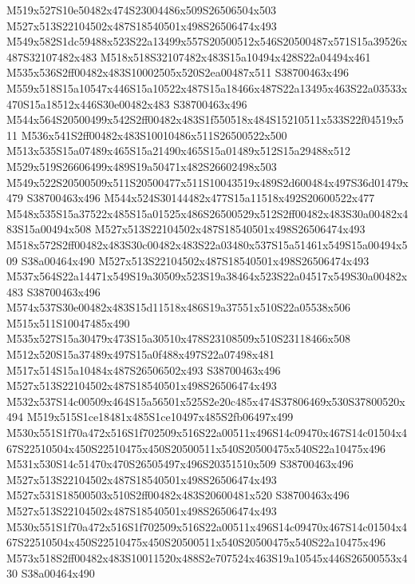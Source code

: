 \documentclass{article}
\begin{document}
\begin{multicols}{2}
M519x527S10e50482x474S23004486x509S26506504x503 M527x513S22104502x487S18540501x498S26506474x493 M549x582S1dc59488x523S22a13499x557S20500512x546S20500487x571S15a39526x487S32107482x483 M518x518S32107482x483S15a10494x428S22a04494x461 M535x536S2ff00482x483S10002505x520S2ea00487x511 S38700463x496 M559x518S15a10547x446S15a10522x487S15a18466x487S22a13495x463S22a03533x470S15a18512x446S30e00482x483 S38700463x496 M544x564S20500499x542S2ff00482x483S1f550518x484S15210511x533S22f04519x511 M536x541S2ff00482x483S10010486x511S26500522x500 M513x535S15a07489x465S15a21490x465S15a01489x512S15a29488x512 M529x519S26606499x489S19a50471x482S26602498x503 M549x522S20500509x511S20500477x511S10043519x489S2d600484x497S36d01479x479 S38700463x496 M544x524S30144482x477S15a11518x492S20600522x477 M548x535S15a37522x485S15a01525x486S26500529x512S2ff00482x483S30a00482x483S15a00494x508 M527x513S22104502x487S18540501x498S26506474x493 M518x572S2ff00482x483S30c00482x483S22a03480x537S15a51461x549S15a00494x509 S38a00464x490 M527x513S22104502x487S18540501x498S26506474x493 M537x564S22a14471x549S19a30509x523S19a38464x523S22a04517x549S30a00482x483 S38700463x496 M574x537S30e00482x483S15d11518x486S19a37551x510S22a05538x506 M515x511S10047485x490 M535x527S15a30479x473S15a30510x478S23108509x510S23118466x508 M512x520S15a37489x497S15a0f488x497S22a07498x481 M517x514S15a10484x487S26506502x493 S38700463x496 M527x513S22104502x487S18540501x498S26506474x493 M532x537S14c00509x464S15a56501x525S2e20c485x474S37806469x530S37800520x494 M519x515S1ce18481x485S1ce10497x485S2fb06497x499 M530x551S1f70a472x516S1f702509x516S22a00511x496S14c09470x467S14c01504x467S22510504x450S22510475x450S20500511x540S20500475x540S22a10475x496 M531x530S14c51470x470S26505497x496S20351510x509 S38700463x496 M527x513S22104502x487S18540501x498S26506474x493 M527x531S18500503x510S2ff00482x483S20600481x520 S38700463x496 M527x513S22104502x487S18540501x498S26506474x493 M530x551S1f70a472x516S1f702509x516S22a00511x496S14c09470x467S14c01504x467S22510504x450S22510475x450S20500511x540S20500475x540S22a10475x496 M573x518S2ff00482x483S10011520x488S2e707524x463S19a10545x446S26500553x430 S38a00464x490


\end{multicols}
\end{document}
